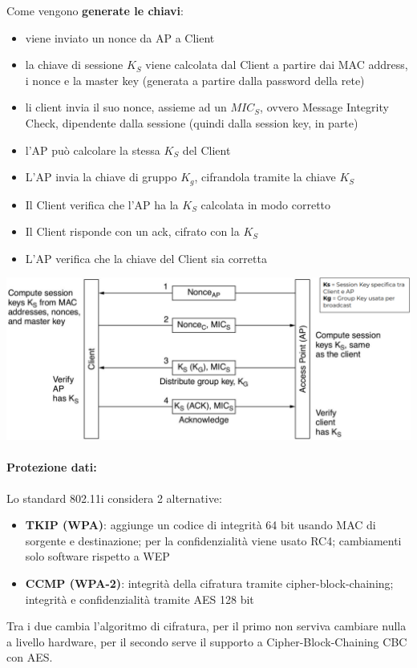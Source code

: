 Come vengono \textbf{generate le chiavi}:
\begin{itemize}
	\item viene inviato un nonce da AP a Client
	\item la chiave di sessione $K_S$ viene calcolata dal Client a partire dai MAC address, i nonce e la master key (generata a partire dalla password della rete)
	\item li client invia il suo nonce, assieme ad un $MIC_S$, ovvero Message Integrity Check, dipendente dalla sessione (quindi dalla session key, in parte)
	\item l'AP può calcolare la stessa $K_S$ del Client
	\item L'AP invia la chiave di gruppo $K_g$, cifrandola tramite la chiave $K_S$
	\item Il Client verifica che l'AP ha la $K_S$ calcolata in modo corretto
	\item Il Client risponde con un ack, cifrato con la $K_S$
	\item L'AP verifica che la chiave del Client sia corretta
\end{itemize}
\begin{center}
	\includegraphics[width=0.95\linewidth]{img/wlan/keygen}
\end{center}

\paragraph{Protezione dati:} Lo standard 802.11i considera 2 alternative: 
\begin{itemize}
	\item \textbf{TKIP (WPA)}: aggiunge un codice di integrità 64 bit usando MAC di sorgente e destinazione; per la confidenzialità viene usato RC4; cambiamenti solo software rispetto a WEP
	\item \textbf{CCMP (WPA-2)}: integrità della cifratura tramite cipher-block-chaining; integrità e confidenzialità tramite AES 128 bit
\end{itemize}
Tra i due cambia l'algoritmo di cifratura, per il primo non serviva cambiare nulla a livello hardware, per il secondo serve il supporto a Cipher-Block-Chaining CBC con AES.

